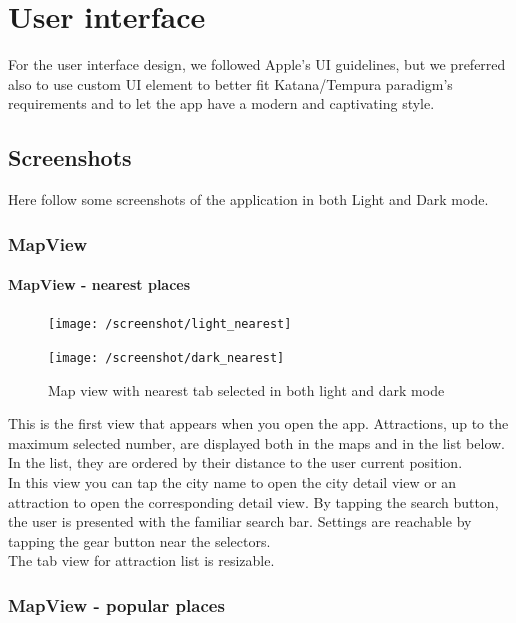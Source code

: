 \documentclass[a4paper, 11pt, parskip=half]{scrreprt}
\theoremstyle{definition}
\begin{document}
\chapter{User interface}
For the user interface design, we followed Apple's UI guidelines, but we preferred also to use custom UI element to better fit Katana/Tempura paradigm's requirements and to let the app have a modern and captivating style.  

\section{Screenshots}
Here follow some screenshots of the application in both Light and Dark mode.

\subsection{MapView}

\subsubsection{MapView - nearest places}

\begin{figure}[H]
	\centering
	\begin{minipage}{.5\textwidth}
  	\centering
  	\texttt{[image: /screenshot/light\_nearest]}
  	\label{fig:test1}
	\end{minipage}%
	\begin{minipage}{.5\textwidth}
  	\centering
  	\texttt{[image: /screenshot/dark\_nearest]}
  	\label{fig:test2}
	\end{minipage}
	\caption{Map view with nearest tab selected in both light and dark mode}
\end{figure}

This is the first view that appears when you open the app. Attractions, up to the maximum selected number, are displayed both in the maps and in the list below. In the list, they are ordered by their distance to the user current position.
\\In this view you can tap the city name to open the city detail view or an attraction to open the corresponding detail view. By tapping the search button, the user is presented with the familiar search bar. Settings are reachable by tapping the gear button near the selectors.
\\The tab view for attraction list is resizable.

\subsection{MapView - popular places}
\end{document}
